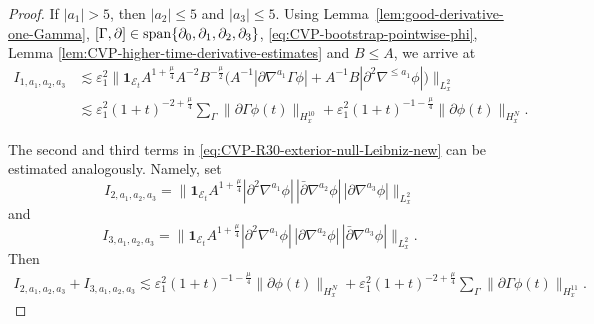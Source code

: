 \documentclass[11pt,twoside]{article}
\def\p{\partial}
\def\ve{\varepsilon}
\def\ls{\lesssim}
\theoremstyle{plain}
\theoremstyle{definition}
\theoremstyle{assumption}
\numberwithin{equation}{section}
\begin{document}
\begin{proof}
If \(|a_1|>5\), then \(|a_2|\le 5\) and \(|a_3|\le 5\). Using
		Lemma~\ref{lem:good-derivative-one-Gamma},
		\([\Gamma,\partial]\in{\rm span}\{\partial_0,\partial_1,\partial_2,\partial_3\}\),
		\eqref{eq:CVP-bootstrap-pointwise-phi}, Lemma \ref{lem:CVP-higher-time-derivative-estimates} and $B\le A$, we
arrive at
		\begin{equation}
			\label{eq:CVP-R30-I1-high-good-new}
			\begin{aligned}
				I_{1,a_1,a_2,a_3}
				&\ls
				\ve_1^2
				\big\|
				\mathbf 1_{\mathcal E_t}
				A^{1+\frac{\mu}{4}}
				A^{-2}B^{-\frac{\mu}{2}}
				\big(
				A^{-1}|\p\nabla^{a_1}\Gamma\phi|
				+
				A^{-1}B|\p^2\nabla^{\le a_1}\phi|
				\big)
				\big\|_{L^2_x}
				\\
				&\ls
				\ve_1^2
				(1+t)^{-2+\frac{\mu}{4}}
				\sum_{\Gamma}
				\|\p\Gamma\phi(t)\|_{H^{10}_x}
				+
				\ve_1^2
				(1+t)^{-1-\frac{\mu}{4}}
				\|\p\phi(t)\|_{H^N_x}.
			\end{aligned}
		\end{equation}
	
		
		The second and third terms in
		\eqref{eq:CVP-R30-exterior-null-Leibniz-new} can be estimated analogously. Namely, set
		\[
		I_{2,a_1,a_2,a_3}
		=
		\big\|
		\mathbf 1_{\mathcal E_t}
		A^{1+\frac{\mu}{4}}
		|\p^2\nabla^{a_1}\phi|\,
		|\bar\p\nabla^{a_2}\phi|\,
		|\p\nabla^{a_3}\phi|
		\big\|_{L^2_x}
		\]
		and
		\[
		I_{3,a_1,a_2,a_3}
		=
		\big\|
		\mathbf 1_{\mathcal E_t}
		A^{1+\frac{\mu}{4}}
		|\p^2\nabla^{a_1}\phi|\,
		|\p\nabla^{a_2}\phi|\,
		|\bar\p\nabla^{a_3}\phi|
		\big\|_{L^2_x}.
		\]
		Then
		\begin{equation}
			\label{eq:CVP-R30-I23-new}
			\begin{aligned}
				I_{2,a_1,a_2,a_3}
				+
				I_{3,a_1,a_2,a_3}
				\ls
				\ve_1^2
				(1+t)^{-1-\frac{\mu}{4}}
				\|\p\phi(t)\|_{H^N_x}
				+\ve_1^2
				(1+t)^{-2+\frac{\mu}{4}}
				\sum_{\Gamma}
				\|\p\Gamma\phi(t)\|_{H^{11}_x}.
			\end{aligned}
		\end{equation}
		

\end{proof}
\end{document}
